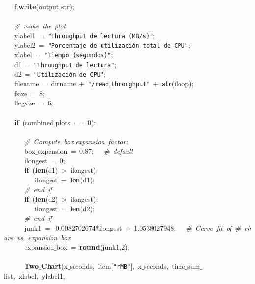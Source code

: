 \mbox{}\ \ \ f.\textbf{write}(output$\_$str); \\
\mbox{}\ \ \  \\
\mbox{}\ \ \ \textit{\#\ make\ the\ plot} \\
\mbox{}\ \ \ ylabel1\ =\ \texttt{"{}Throughput\ de\ lectura\ (MB/s)"{}}; \\
\mbox{}\ \ \ ylabel2\ =\ \texttt{"{}Porcentaje\ de\ utilización\ total\ de\ CPU"{}}; \\
\mbox{}\ \ \ xlabel\ =\ \texttt{"{}Tiempo\ (segundos)"{}}; \\
\mbox{}\ \ \ d1\ =\ \texttt{"{}Throughput\ de\ lectura"{}}; \\
\mbox{}\ \ \ d2\ =\ \texttt{"{}Utilización\ de\ CPU"{}}; \\
\mbox{}\ \ \ filename\ =\ dirname\ +\ \texttt{"{}/read$\_$throughput"{}}\ +\ \textbf{str}(iloop); \\
\mbox{}\ \ \ fsize\ =\ 8; \\
\mbox{}\ \ \ flegsize\ =\ 6; \\
\mbox{}\ \ \  \\
\mbox{}\ \ \ \textbf{if}\ (combined$\_$plots\ ==\ 0): \\
\mbox{}\ \ \ \ \ \  \\
\mbox{}\ \ \ \ \ \ \textit{\#\ Compute\ box$\_$expansion\ factor:} \\
\mbox{}\ \ \ \ \ \ box$\_$expansion\ =\ 0.87;\ \ \ \textit{\#\ default} \\
\mbox{}\ \ \ \ \ \ ilongest\ =\ 0; \\
\mbox{}\ \ \ \ \ \ \textbf{if}\ (\textbf{len}(d1)\ \textgreater{}\ ilongest): \\
\mbox{}\ \ \ \ \ \ \ \ \ ilongest\ =\ \textbf{len}(d1); \\
\mbox{}\ \ \ \ \ \ \textit{\#\ end\ if} \\
\mbox{}\ \ \ \ \ \ \textbf{if}\ (\textbf{len}(d2)\ \textgreater{}\ ilongest): \\
\mbox{}\ \ \ \ \ \ \ \ \ ilongest\ =\ \textbf{len}(d2); \\
\mbox{}\ \ \ \ \ \ \textit{\#\ end\ if} \\
\mbox{}\ \ \ \ \ \ junk1\ =\ -0.0082702674*ilongest\ +\ 1.0538027948;\ \ \ \textit{\#\ Curve\ fit\ of\ \#\ chars\ vs.\ expansion\ box} \\
\mbox{}\ \ \ \ \ \ expansion$\_$box\ =\ \textbf{round}(junk1,2); \\
\mbox{}\ \ \ \ \ \  \\
\mbox{}\ \ \ \ \ \ \textbf{Two$\_$Chart}(x$\_$seconds,\ item[\texttt{"{}rMB"{}}],\ x$\_$seconds,\ time$\_$sum$\_$list,\ xlabel,\ ylabel1,\  \\
